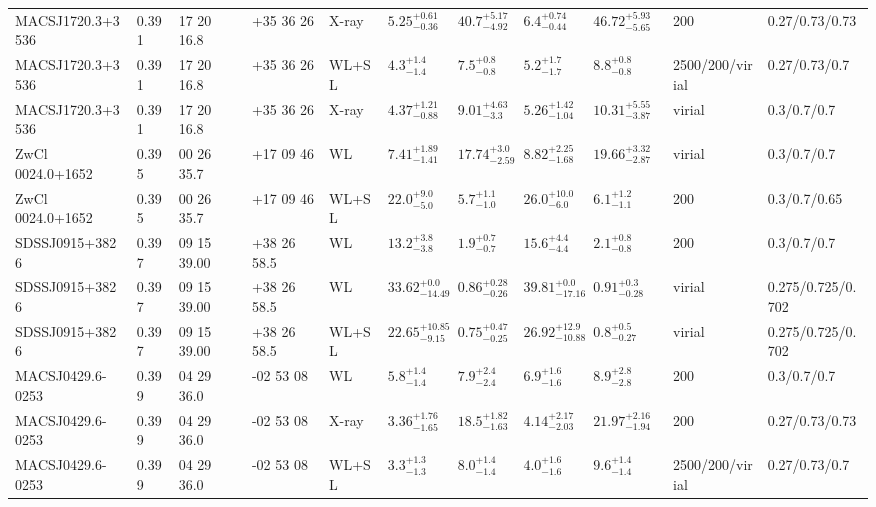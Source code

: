 \begin{landscape}
\begin{center}
{\begin{longtable}{llllllllllll}
MACSJ1720.3+3536 & 0.391 & 17 20 16.8 & +35 36 26 & X-ray & ${5.25}^{+0.61}_{-0.36}$ & ${40.7}^{+5.17}_{-4.92}$ & ${6.4}^{+0.74}_{-0.44}$ & ${46.72}^{+5.93}_{-5.65}$ & \citet{BA14.1} & 200 & 0.27/0.73/0.73 \\
MACSJ1720.3+3536 & 0.391 & 17 20 16.8 & +35 36 26 & WL+SL & ${4.3}^{+1.4}_{-1.4}$ & ${7.5}^{+0.8}_{-0.8}$ & ${5.2}^{+1.7}_{-1.7}$ & ${8.8}^{+0.8}_{-0.8}$ & \citet{ME14.1} & 2500/200/virial & 0.27/0.73/0.7 \\
MACSJ1720.3+3536 & 0.391 & 17 20 16.8 & +35 36 26 & X-ray & ${4.37}^{+1.21}_{-0.88}$ & ${9.01}^{+4.63}_{-3.3}$ & ${5.26}^{+1.42}_{-1.04}$ & ${10.31}^{+5.55}_{-3.87}$ & \citet{SC07.1} & virial & 0.3/0.7/0.7 \\
ZwCl 0024.0+1652 & 0.395 & 00 26 35.7 & +17 09 46 & WL & ${7.41}^{+1.89}_{-1.41}$ & ${17.74}^{+3.0}_{-2.59}$ & ${8.82}^{+2.25}_{-1.68}$ & ${19.66}^{+3.32}_{-2.87}$ & \citet{UM11.1} & virial & 0.3/0.7/0.7 \\
ZwCl 0024.0+1652 & 0.395 & 00 26 35.7 & +17 09 46 & WL+SL & ${22.0}^{+9.0}_{-5.0}$ & ${5.7}^{+1.1}_{-1.0}$ & ${26.0}^{+10.0}_{-6.0}$ & ${6.1}^{+1.2}_{-1.1}$ & \citet{KN03.1} & 200 & 0.3/0.7/0.65 \\
SDSSJ0915+3826 & 0.397 & 09 15 39.00 & +38 26 58.5 & WL & ${13.2}^{+3.8}_{-3.8}$ & ${1.9}^{+0.7}_{-0.7}$ & ${15.6}^{+4.4}_{-4.4}$ & ${2.1}^{+0.8}_{-0.8}$ & \citet{SE14.1} & 200 & 0.3/0.7/0.7 \\
SDSSJ0915+3826 & 0.397 & 09 15 39.00 & +38 26 58.5 & WL & ${33.62}^{+0.0}_{-14.49}$ & ${0.86}^{+0.28}_{-0.26}$ & ${39.81}^{+0.0}_{-17.16}$ & ${0.91}^{+0.3}_{-0.28}$ & \citet{OG12.1} & virial & 0.275/0.725/0.702 \\
SDSSJ0915+3826 & 0.397 & 09 15 39.00 & +38 26 58.5 & WL+SL & ${22.65}^{+10.85}_{-9.15}$ & ${0.75}^{+0.47}_{-0.25}$ & ${26.92}^{+12.9}_{-10.88}$ & ${0.8}^{+0.5}_{-0.27}$ & \citet{OG12.1} & virial & 0.275/0.725/0.702 \\
MACSJ0429.6-0253 & 0.399 & 04 29 36.0 & -02 53 08 & WL & ${5.8}^{+1.4}_{-1.4}$ & ${7.9}^{+2.4}_{-2.4}$ & ${6.9}^{+1.6}_{-1.6}$ & ${8.9}^{+2.8}_{-2.8}$ & \citet{SE14.1} & 200 & 0.3/0.7/0.7 \\
MACSJ0429.6-0253 & 0.399 & 04 29 36.0 & -02 53 08 & X-ray & ${3.36}^{+1.76}_{-1.65}$ & ${18.5}^{+1.82}_{-1.63}$ & ${4.14}^{+2.17}_{-2.03}$ & ${21.97}^{+2.16}_{-1.94}$ & \citet{BA14.1} & 200 & 0.27/0.73/0.73 \\
MACSJ0429.6-0253 & 0.399 & 04 29 36.0 & -02 53 08 & WL+SL & ${3.3}^{+1.3}_{-1.3}$ & ${8.0}^{+1.4}_{-1.4}$ & ${4.0}^{+1.6}_{-1.6}$ & ${9.6}^{+1.4}_{-1.4}$ & \citet{ME14.1} & 2500/200/virial & 0.27/0.73/0.7 \\

\end{longtable}}
\end{center}
\end{landscape}
